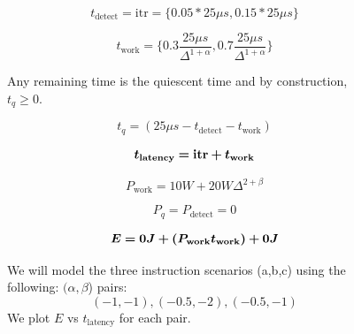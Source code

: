 \begin{figure}
{{\begin{minipage}{18em}
$$t_{\text{detect}} = \text{itr} = \{0.05*25{\mu}s, 0.15*25{\mu}s\}$$




$$t_{\text{work}} = \{0.3\frac{25{\mu}s}{\Delta^{1+\alpha}}, 0.7\frac{25{\mu}s}{\Delta^{1+\alpha}}\}$$



Any remaining time is the quiescent time and by construction, $t_q \geq 0$.

$$t_q = (25{\mu}s - t_{\text{detect}} - t_{\text{work}})$$


\begin{equation}
\bm{t_{\text{\bf{latency}}} = \text{\bf{itr}} + t_{\text{\bf{work}}}}	
\end{equation}


$$P_{\text{work}} = 10W + 20W \Delta^{2+\beta}$$


$$P_q = P_{\text{detect}} = 0$$



\begin{equation}
\bm{E = 0J + (P_{\text{\bf{work}}} t_{\text{\bf{work}}}) + 0J}	
\end{equation}

We will model the three instruction scenarios (a,b,c) using the following: $(\alpha,\beta$) pairs:
$$(-1,-1), (-0.5,-2), (-0.5, -1) $$
We plot $E$ vs $t_{\text{latency}}$ for each pair.

\end{minipage}
}
}
\label{fig:simdesc}
\vspace*{-.2in}
\end{figure}


